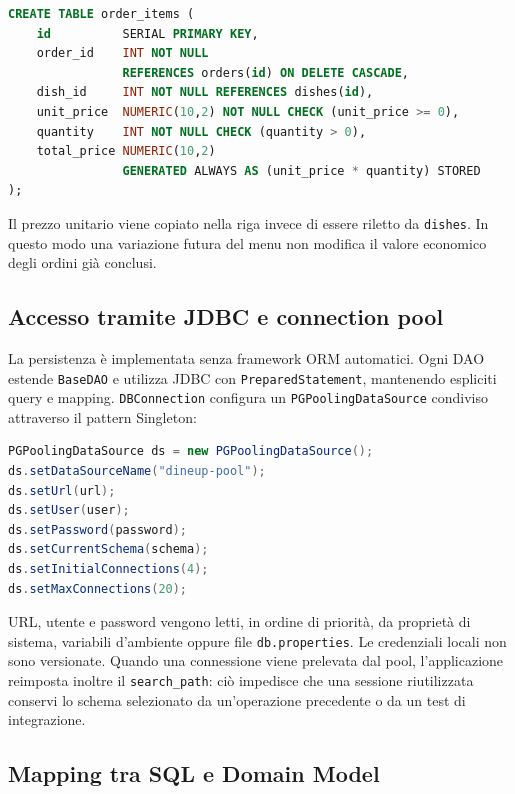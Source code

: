 \documentclass[12pt,a4paper]{article}
\newcommand{\code}[1]{\nolinkurl{#1}}
\begin{document}
\begin{lstlisting}[style=codeStyle,language=SQL,
caption={Vincoli e colonna calcolata delle righe d'ordine.}]
CREATE TABLE order_items (
    id          SERIAL PRIMARY KEY,
    order_id    INT NOT NULL
                REFERENCES orders(id) ON DELETE CASCADE,
    dish_id     INT NOT NULL REFERENCES dishes(id),
    unit_price  NUMERIC(10,2) NOT NULL CHECK (unit_price >= 0),
    quantity    INT NOT NULL CHECK (quantity > 0),
    total_price NUMERIC(10,2)
                GENERATED ALWAYS AS (unit_price * quantity) STORED
);
\end{lstlisting}

Il prezzo unitario viene copiato nella riga invece di essere riletto da
\code{dishes}. In questo modo una variazione futura del menu non modifica il
valore economico degli ordini già conclusi.

\subsection{Accesso tramite JDBC e connection pool}

La persistenza è implementata senza framework ORM automatici. Ogni DAO estende
\code{BaseDAO} e utilizza JDBC con \code{PreparedStatement}, mantenendo
espliciti query e mapping. \code{DBConnection} configura un
\code{PGPoolingDataSource} condiviso attraverso il pattern Singleton:

\begin{lstlisting}[style=codeStyle,language=Java,
caption={Configurazione del pool di connessioni PostgreSQL.}]
PGPoolingDataSource ds = new PGPoolingDataSource();
ds.setDataSourceName("dineup-pool");
ds.setUrl(url);
ds.setUser(user);
ds.setPassword(password);
ds.setCurrentSchema(schema);
ds.setInitialConnections(4);
ds.setMaxConnections(20);
\end{lstlisting}

URL, utente e password vengono letti, in ordine di priorità, da proprietà di
sistema, variabili d'ambiente oppure file \code{db.properties}. Le credenziali
locali non sono versionate. Quando una connessione viene prelevata dal pool,
l'applicazione reimposta inoltre il \code{search\_path}: ciò impedisce che una
sessione riutilizzata conservi lo schema selezionato da un'operazione precedente
o da un test di integrazione.

\subsection{Mapping tra SQL e Domain Model}
\end{document}
